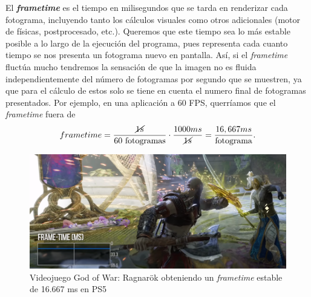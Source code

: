 El \textbf{\textit{frametime}} es el tiempo en milisegundos que se tarda en renderizar cada fotograma, incluyendo tanto los cálculos visuales como otros adicionales (motor de físicas, postprocesado, etc.). Queremos que este tiempo sea lo más estable posible a lo largo de la ejecución del programa, pues representa cada cuanto tiempo se nos presenta un fotograma nuevo en pantalla. Así, si el \textit{frametime} fluctúa mucho tendremos la sensación de que la imagen no es fluida independientemente del número de fotogramas por segundo que se muestren, ya que para el cálculo de estos solo se tiene en cuenta el numero final de fotogramas presentados. Por ejemplo, en una aplicación a 60 FPS, querríamos que el \textit{frametime} fuera de 
\begin{equation*}
   frametime = \frac{\cancel{1s}}{60 \text{ fotogramas}}\cdot \frac{1000 ms}{\cancel{1s}} = \frac{16,667 ms}{\text{fotograma}}.  
\end{equation*}
\begin{figure}[!ht]
    \centering
    \includegraphics[width=\textwidth]{Plantilla-TFG-master/img/gow.png}
    \caption{Videojuego God of War: Ragnarök obteniendo un \textit{frametime} estable de 16.667 ms en PS5 \cite{gow}}
\end{figure}


